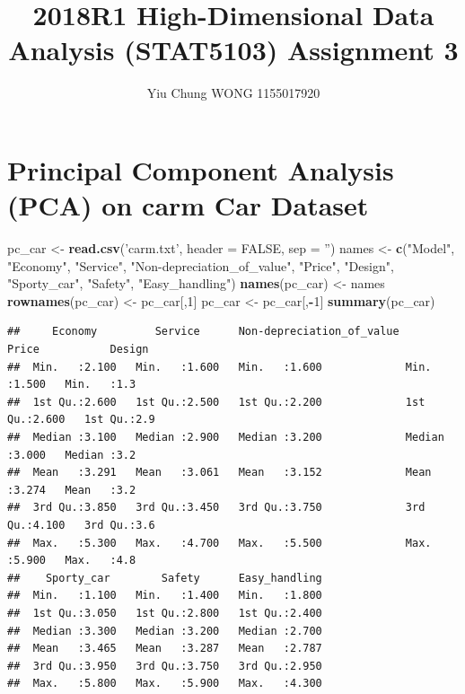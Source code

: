 \documentclass[]{article}
\title{2018R1 High-Dimensional Data Analysis (STAT5103) Assignment 3}
\author{Yiu Chung WONG 1155017920}
\date{}
\newenvironment{Shaded}{\begin{snugshade}}{\end{snugshade}}
\newcommand{\KeywordTok}[1]{\textcolor[rgb]{0.13,0.29,0.53}{\textbf{#1}}}
\newcommand{\DataTypeTok}[1]{\textcolor[rgb]{0.13,0.29,0.53}{#1}}
\newcommand{\DecValTok}[1]{\textcolor[rgb]{0.00,0.00,0.81}{#1}}
\newcommand{\StringTok}[1]{\textcolor[rgb]{0.31,0.60,0.02}{#1}}
\newcommand{\OtherTok}[1]{\textcolor[rgb]{0.56,0.35,0.01}{#1}}
\newcommand{\OperatorTok}[1]{\textcolor[rgb]{0.81,0.36,0.00}{\textbf{#1}}}
\newcommand{\NormalTok}[1]{#1}
\begin{document}
\maketitle

\section{Principal Component Analysis (PCA) on carm Car
Dataset}\label{principal-component-analysis-pca-on-carm-car-dataset}

\begin{Shaded}
\begin{Highlighting}[]
\NormalTok{pc_car <-}\StringTok{ }\KeywordTok{read.csv}\NormalTok{(}\StringTok{'carm.txt'}\NormalTok{, }\DataTypeTok{header =} \OtherTok{FALSE}\NormalTok{, }\DataTypeTok{sep =} \StringTok{''}\NormalTok{)}
\NormalTok{names <-}\StringTok{ }\KeywordTok{c}\NormalTok{(}\StringTok{"Model"}\NormalTok{, }\StringTok{"Economy"}\NormalTok{, }\StringTok{"Service"}\NormalTok{, }\StringTok{"Non-depreciation_of_value"}\NormalTok{, }\StringTok{"Price"}\NormalTok{, }\StringTok{"Design"}\NormalTok{, }\StringTok{"Sporty_car"}\NormalTok{, }\StringTok{"Safety"}\NormalTok{, }\StringTok{"Easy_handling"}\NormalTok{)}
\KeywordTok{names}\NormalTok{(pc_car) <-}\StringTok{ }\NormalTok{names}
\KeywordTok{rownames}\NormalTok{(pc_car) <-}\StringTok{ }\NormalTok{pc_car[,}\DecValTok{1}\NormalTok{]}
\NormalTok{pc_car <-}\StringTok{ }\NormalTok{pc_car[,}\OperatorTok{-}\DecValTok{1}\NormalTok{]}
\KeywordTok{summary}\NormalTok{(pc_car)}
\end{Highlighting}
\end{Shaded}

\begin{verbatim}
##     Economy         Service      Non-depreciation_of_value     Price           Design   
##  Min.   :2.100   Min.   :1.600   Min.   :1.600             Min.   :1.500   Min.   :1.3  
##  1st Qu.:2.600   1st Qu.:2.500   1st Qu.:2.200             1st Qu.:2.600   1st Qu.:2.9  
##  Median :3.100   Median :2.900   Median :3.200             Median :3.000   Median :3.2  
##  Mean   :3.291   Mean   :3.061   Mean   :3.152             Mean   :3.274   Mean   :3.2  
##  3rd Qu.:3.850   3rd Qu.:3.450   3rd Qu.:3.750             3rd Qu.:4.100   3rd Qu.:3.6  
##  Max.   :5.300   Max.   :4.700   Max.   :5.500             Max.   :5.900   Max.   :4.8  
##    Sporty_car        Safety      Easy_handling  
##  Min.   :1.100   Min.   :1.400   Min.   :1.800  
##  1st Qu.:3.050   1st Qu.:2.800   1st Qu.:2.400  
##  Median :3.300   Median :3.200   Median :2.700  
##  Mean   :3.465   Mean   :3.287   Mean   :2.787  
##  3rd Qu.:3.950   3rd Qu.:3.750   3rd Qu.:2.950  
##  Max.   :5.800   Max.   :5.900   Max.   :4.300
\end{verbatim}
\end{document}
